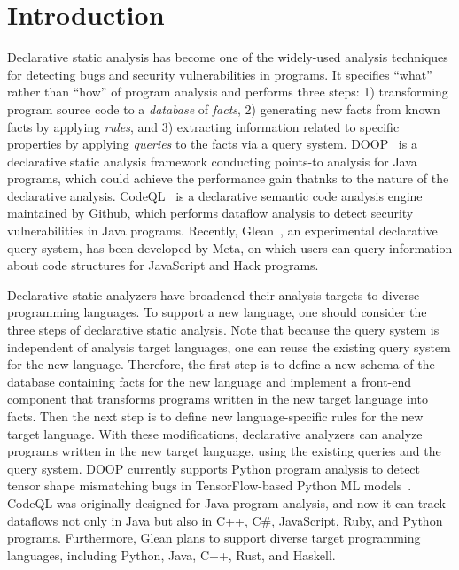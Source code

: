 \section{Introduction}
Declarative static analysis has become one of the widely-used analysis techniques
for detecting bugs and security vulnerabilities in programs.
It specifies ``what'' rather than ``how'' of program analysis and
performs three steps:
1) transforming program source code to a {\it database}
of {\it facts}, 2) generating new facts from known facts by applying
{\it rules}, and 3) extracting information related to specific properties by
applying {\it queries} to the facts via a query system.  DOOP~\cite{doop} is a
declarative static analysis framework conducting points-to analysis for Java
programs, which could achieve the performance gain thatnks to the nature
of the declarative analysis. CodeQL~\cite{codeql} is a declarative semantic code analysis engine
maintained by Github, which performs dataflow analysis to detect security
vulnerabilities in Java programs.  Recently, Glean~\cite{glean}, an experimental
declarative query system, has been developed by Meta, on which users can query
information about code structures for JavaScript and Hack programs.

Declarative static analyzers have broadened their analysis targets to diverse
programming languages. To support a new language, one should consider
the three steps of declarative static analysis. Note that because the query
system is independent of analysis target languages, one can reuse the
existing query system for the new language. Therefore, the first step
is to define a new schema of the database containing facts for the new
language and implement a
front-end component that transforms programs written in the new target language into facts.
Then the next step is to define new language-specific rules for the new target language.  With these
modifications, declarative analyzers can analyze programs written in the new
target language, using the existing queries and the query system.  DOOP currently
supports Python program analysis to detect tensor shape mismatching bugs in
TensorFlow-based Python ML models~\cite{lagouvardos2020static}. CodeQL was
originally designed for Java program analysis, and now it can track dataflows not only
in Java but also in C++, C\#, JavaScript, Ruby, and Python programs.
Furthermore, Glean plans to support diverse target programming languages,
including Python, Java, C++, Rust, and Haskell.

